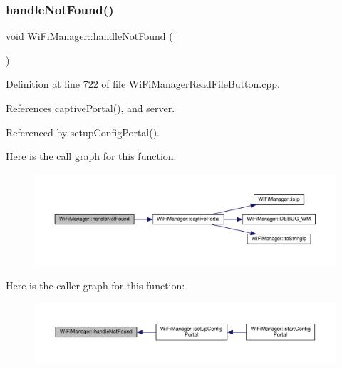 \subsubsection{\texorpdfstring{handle\+Not\+Found()}{handleNotFound()}}
{\footnotesize\ttfamily void Wi\+Fi\+Manager\+::handle\+Not\+Found (\begin{DoxyParamCaption}{ }\end{DoxyParamCaption})\hspace{0.3cm}{\ttfamily [private]}}



Definition at line 722 of file Wi\+Fi\+Manager\+Read\+File\+Button.\+cpp.



References captive\+Portal(), and server.



Referenced by setup\+Config\+Portal().

Here is the call graph for this function\+:
\nopagebreak
\begin{figure}[H]
\begin{center}
\leavevmode
\includegraphics[width=350pt]{d4/dc8/class_wi_fi_manager_a7d01f7de3e4b76acdabffac79fa3d0ab_cgraph}
\end{center}
\end{figure}
Here is the caller graph for this function\+:
\nopagebreak
\begin{figure}[H]
\begin{center}
\leavevmode
\includegraphics[width=350pt]{d4/dc8/class_wi_fi_manager_a7d01f7de3e4b76acdabffac79fa3d0ab_icgraph}
\end{center}
\end{figure}
\mbox{\label{class_wi_fi_manager_ac924dc071144e609afcf52073176c11f}} 
